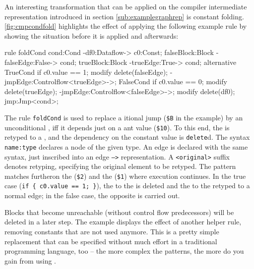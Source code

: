 An interesting transformation that can be applied on the compiler intermediate representation introduced in section \ref{sub:examplegraphrep} is constant folding.
\autoref{fig:cmpcondfold} highlights the effect of applying the following example rule by showing the situation before it is applied and afterwards:

\begin{grgen}
rule foldCond {
	cond:Cond -df0:Dataflow-> c0:Const;
	falseBlock:Block -falseEdge:False-> cond;
	trueBlock:Block -trueEdge:True-> cond;
	alternative {
		TrueCond {
			if { c0.value == 1; }
			modify {
				delete(falseEdge);
				-jmpEdge:Controlflow<trueEdge>->;
			}
		}
		FalseCond {
			if { c0.value == 0; }
			modify {
				delete(trueEdge);
				-jmpEdge:Controlflow<falseEdge>->;
			}
		}
	}
	modify {
		delete(df0);
		jmp:Jmp<cond>;
	}
}
\end{grgen}

The rule \texttt{foldCond} is used to replace a itional jump (\texttt{\$B} in the example) by an unconditional , iff it depends just on a ant value (\texttt{\$10}).
To this end, the  is retyped to a ,
and the dependency on the constant value is \texttt{delete}d.
The syntax \texttt{name:type} declares a node of the given type.
An edge is declared with the same syntax, just inscribed into an edge \texttt{-->} representation.
A \texttt{<original>} suffix denotes retyping, specifying the original element to be retyped.
The pattern matches furtheron the  (\texttt{\$2}) and the  (\texttt{\$1}) where execution continues.
In the true case (\texttt{if \{ c0.value == 1; \}}), the  to the  is deleted and the  to the  retyped to a normal  edge; in the false case, the opposite is carried out.

Blocks that become unreachable (without control flow predecessors) will be deleted in a later step.
The example displays the effect of another helper rule, removing constants that are not used anymore.
This is a pretty simple replacement that can be specified without much effort in a traditional programming language, too -- the more complex the patterns, the more do you gain from using \GrG.

